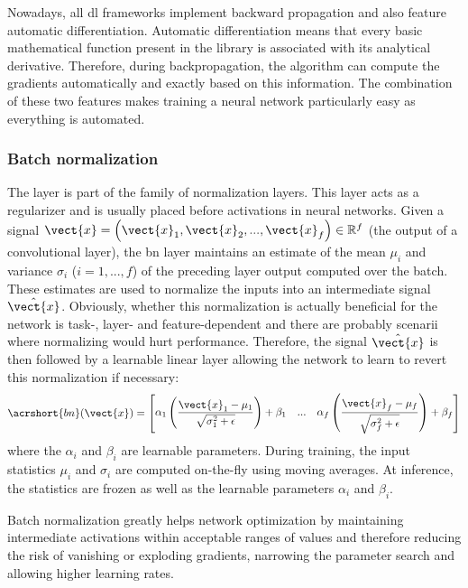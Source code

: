 Nowadays, all \acrlong{dl} frameworks implement backward propagation and also
feature automatic differentiation. Automatic differentiation means that every
basic mathematical function present in the library is associated with its analytical
derivative. Therefore, during backpropagation, the algorithm can compute the
gradients automatically and exactly based on this information. The combination of
these two features makes training a neural network particularly easy as everything
is automated.

\subsubsection{Batch normalization}
\label{sssec:backml:batchnorm}

The  \cite{ioffe2015batch} layer is part of the family of
normalization layers. This layer acts as a regularizer and is usually placed before
activations in neural networks. Given a signal
$\vect{x} = \left(\vect{x}_1, \vect{x}_2, ..., \vect{x}_f\right) \in \mathbb{R}^f$
(\eg the output of a convolutional layer), the \acrshort{bn} layer maintains an
estimate of the mean $\mu_i$ and variance $\sigma_i$ ($i = 1, ..., f$) of the
preceding layer output computed over the batch. These estimates are used to
normalize the inputs into an intermediate signal $\hat{\vect{x}}$. Obviously,
whether this normalization is actually beneficial for the network is task-, layer-
and feature-dependent and there are probably scenarii where normalizing would hurt
performance. Therefore, the signal $\hat{\vect{x}}$ is then followed by a learnable
linear layer allowing the network to learn to revert this normalization if
necessary:
\begin{equation}
\label{eqn:backml:bn}
\acrshort{bn}(\vect{x}) = \begin{bmatrix}
\alpha_1 \left(\dfrac{\vect{x}_1 - \mu_1}{\sqrt{\sigma^2_1 + \epsilon}}\right) + \beta_1 & ... & \alpha_f \left(\dfrac{\vect{x}_f - \mu_f}{\sqrt{\sigma^2_f + \epsilon}}\right) + \beta_f \\
\end{bmatrix}\end{equation}
where the $\alpha_i$ and $\beta_i$ are learnable parameters. During training,
the input statistics $\mu_i$ and $\sigma_i$ are computed on-the-fly using moving
averages. At inference, the statistics are frozen as well as the learnable parameters
$\alpha_i$ and $\beta_i$.

Batch normalization greatly helps network optimization by maintaining intermediate
activations within acceptable ranges of values and therefore reducing the risk of
vanishing or exploding gradients, narrowing the parameter search and allowing
higher learning rates.

